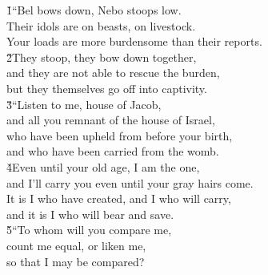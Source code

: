\begin{poetry}
\poeml {}
\v{1}``Bel bows down, Nebo stoops low. \\
\poemll    Their idols are on beasts, on livestock. \\
\poemlll       Your loads are more burdensome than their reports. \\
\poeml \v{2}They stoop, they bow down together, \\
\poemll    and they are not able to rescue the burden, \\
\poemlll       but they themselves go off into captivity. \\
\poeml \v{3}``Listen to me, house of Jacob, \\
\poemll    and all you remnant of the house of Israel, \\
\poeml who have been upheld from before your birth, \\
\poemll    and who have been carried from the womb. \\
\poeml \v{4}Even until your old age, I am the one, \\
\poemll    and I'll carry you even until your gray hairs come. \\
\poeml It is I who have created, and I who will carry, \\
\poemll    and it is I who will bear and save. \\
\poeml \v{5}``To whom will you compare me, \\
\poemll    count me equal, or liken me, \\
\poemlll       so that I may be compared? \\

\end{poetry}
